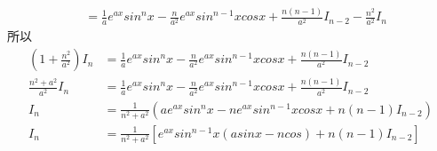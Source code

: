 \documentclass{article}
\begin{document}
\begin{itemize}
\begin{align*}
              & = \frac{1}{a} e^{ax} sin^n x - \frac{n}{a^2} e^{ax} sin^{n - 1}xcosx + \frac{n(n-1)}{a^2} I_{n-2} - \frac{n^2}{a^2} I_n
        \end{align*}
        所以
        \begin{align*}
          (1 + \frac{n^2}{a^2})I_n  & = \frac{1}{a} e^{ax} sin^n x - \frac{n}{a^2} e^{ax} sin^{n - 1}xcosx + \frac{n(n-1)}{a^2} I_{n-2} \\
          \frac{n^2 + a^2}{a^2} I_n & = \frac{1}{a} e^{ax} sin^n x - \frac{n}{a^2} e^{ax} sin^{n - 1}xcosx + \frac{n(n-1)}{a^2} I_{n-2} \\
          I_n                       & = \frac{1}{n^2 + a^2}(a e^{ax} sin^n x - n e^{ax} sin^{n - 1}xcosx + n(n-1)I_{n-2})               \\
          I_n                       & = \frac{1}{n^2 + a^2}[ e^{ax} sin^{n-1} x(a sin x - ncos)  + n(n-1)I_{n-2}]                       \\
        \end{align*}
\end{itemize}
\end{document}
